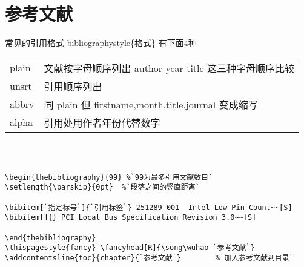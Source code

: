 \section{参考文献}
常见的引用格式 bibliographystyle\{格式\} 有下面4种\\


\begin{tabular}{ll}
  plain & 文献按字母顺序列出 author year  title 这三种字母顺序比较 \\
  unsrt & 引用顺序列出\\
  abbrv & 同 plain 但 firstname,month,title,journal 变成缩写\\
  alpha & 引用处用作者年份代替数字 \\

\end{tabular}

\begin{lstlisting}[language={[LaTeX]TeX}]



\begin{thebibliography}{99} %`99为最多引用文献数目`
\setlength{\parskip}{0pt}  %`段落之间的竖直距离`

\bibitem[`指定标号`]{`引用标签`} 251289-001  Intel Low Pin Count~~[S]
\bibitem[]{} PCI Local Bus Specification Revision 3.0~~[S]

\end{thebibliography}
\thispagestyle{fancy} \fancyhead[R]{\song\wuhao `参考文献`}
\addcontentsline{toc}{chapter}{`参考文献`}        %`加入参考文献到目录`
\end{lstlisting}
